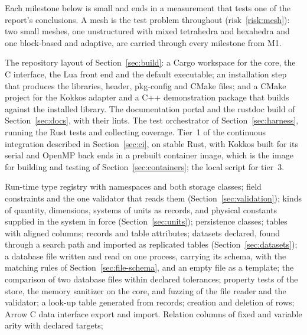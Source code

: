 \documentclass[11pt,a4paper]{article}
\begin{document}
Each milestone below is small and ends in a measurement that tests one of the
report's conclusions.  A mesh is the test problem throughout
(risk~\ref{risk:mesh}): two small meshes, one unstructured with mixed
tetrahedra and hexahedra and one block-based and adaptive, are carried
through every milestone from M1.

\begin{description}[style=nextline,leftmargin=2em]
  \item[M0. Workspace.]
        The repository layout of Section~\ref{sec:build}: a Cargo workspace
        for the core, the C interface, the Lua front end and the default
        executable; an installation step that produces the libraries, header,
        pkg-config and CMake files; and a CMake project for the Kokkos
        adapter and a C++ demonstration package that builds against the
        installed library.  The documentation portal and the rustdoc build of
        Section~\ref{sec:docs}, with their lints.  The test orchestrator of
        Section~\ref{sec:harness}, running the Rust tests and collecting
        coverage.  Tier~1 of the continuous
        integration described in Section~\ref{sec:ci}, on stable Rust, with Kokkos built for its
        serial and OpenMP back ends in a prebuilt container image, which is
        the image for building and testing of Section~\ref{sec:containers}; the
        local script for tier~3.
  \item[M1. Schema and store, host only.]
        Run-time type registry with namespaces and both storage classes;
        field constraints and the one validator that reads them
        (Section~\ref{sec:validation}); kinds of quantity, dimensions,
        systems of units as records, and physical constants supplied in the
        system in force (Section~\ref{sec:units});
        persistence classes; tables with aligned columns; records and table
        attributes; datasets declared, found through a search path and
        imported as replicated tables (Section~\ref{sec:datasets}); a
        database file written and read on one process,
        carrying its schema, with the matching rules of
        Section~\ref{sec:file-schema}, and an empty file as a template; the
        comparison of two database files within declared tolerances;
        property tests of the store, the memory sanitizer on the core, and
        fuzzing of the file reader and the validator; a
        look-up
        table generated from records; creation and deletion of rows; Arrow C
        data interface export and import.
        Relation columns of fixed and variable arity with declared targets;

\end{description}
\end{document}
